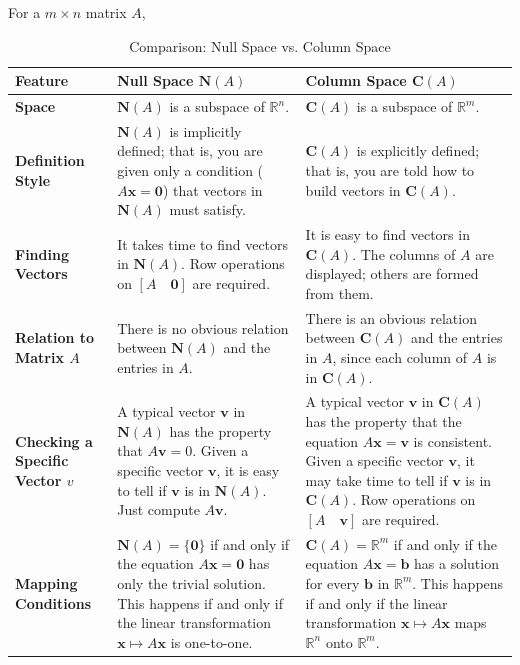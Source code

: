 \documentclass[../linear-algebra.tex]{subfiles}
\begin{document}
\begin{table}[H]
For a $m \times n$ matrix $A$,
\centering
\renewcommand{\arraystretch}{1.5}
\begin{tabular}{|p{3cm}|p{6cm}|p{6cm}|}
\hline
\textbf{Feature} & \textbf{Null Space $\mathbf{N}(A)$} & \textbf{Column Space $\mathbf{C}(A)$} \\ \hline
\textbf{Space} & $\mathbf{N}(A)$ is a subspace of $\mathbb{R}^n$. & $\mathbf{C}(A)$ is a subspace of $\mathbb{R}^m$. \\ \hline
\textbf{Definition Style} & $\mathbf{N}(A)$ is implicitly defined; that is, you are given only a condition ($A\mathbf{x}=\mathbf{0}$) that vectors in $\mathbf{N}(A)$ must satisfy. & $\mathbf{C}(A)$ is explicitly defined; that is, you are told how to build vectors in $\mathbf{C}(A)$. \\ \hline
\textbf{Finding Vectors} & It takes time to find vectors in $\mathbf{N}(A)$. Row operations on $[A \quad \mathbf{0}]$ are required. & It is easy to find vectors in $\mathbf{C}(A)$. The columns of $A$ are displayed; others are formed from them. \\ \hline
\textbf{Relation to Matrix $A$} & There is no obvious relation between $\mathbf{N}(A)$ and the entries in $A$. & There is an obvious relation between $\mathbf{C}(A)$ and the entries in $A$, since each column of $A$ is in $\mathbf{C}(A)$. \\ \hline
\textbf{Checking a Specific Vector $v$} & A typical vector $\mathbf{v}$ in $\mathbf{N}(A)$ has the property that $A\mathbf{v}=0$. Given a specific vector $\mathbf{v}$, it is easy to tell if $\mathbf{v}$ is in $\mathbf{N}(A)$. Just compute $A\mathbf{v}$. & A typical vector $\mathbf{v}$ in $\mathbf{C}(A)$ has the property that the equation $A\mathbf{x}=\mathbf{v}$ is consistent. Given a specific vector $\mathbf{v}$, it may take time to tell if $\mathbf{v}$ is in $\mathbf{C}(A)$. Row operations on $[A \quad \mathbf{v}]$ are required. \\ \hline
\textbf{Mapping Conditions} & $\mathbf{N}(A) = \{\mathbf{0}\}$ if and only if the equation $A\mathbf{x}=\mathbf{0}$ has only the trivial solution. This happens if and only if the linear transformation $\mathbf{x} \mapsto A\mathbf{x}$ is one-to-one. & $\mathbf{C}(A) = \mathbb{R}^m$ if and only if the equation $A\mathbf{x}=\mathbf{b}$ has a solution for every $\mathbf{b}$ in $\mathbb{R}^m$. This happens if and only if the linear transformation $\mathbf{x} \mapsto A\mathbf{x}$ maps $\mathbb{R}^n$ onto $\mathbb{R}^m$. \\ \hline
\end{tabular}
\caption*{Comparison: Null Space vs. Column Space}
\label{tab:nul_vs_col}
\end{table}
\end{document}
